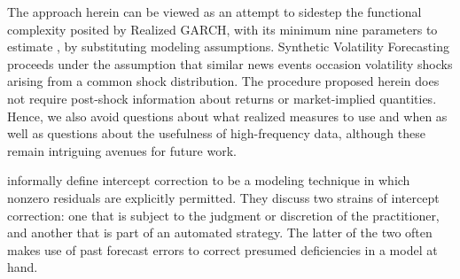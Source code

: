 \documentclass[11pt]{article}
\theoremstyle{definition}
\begin{document}
The approach herein can be viewed as an attempt to sidestep the functional complexity posited by Realized GARCH, with its minimum nine parameters to estimate \citep{sharma2016forecasting}, by substituting modeling assumptions.  Synthetic Volatility Forecasting proceeds under the assumption that similar news events occasion volatility shocks arising from a common shock distribution.  The procedure proposed herein does not require post-shock information about returns or market-implied quantities.  Hence, we also avoid questions about what realized measures to use and when as well as questions about the usefulness of high-frequency data, although these remain intriguing avenues for future work.

\citet{clements1998forecasting} informally define intercept correction to be a modeling technique in which nonzero residuals are explicitly permitted.  They discuss two strains of intercept correction: one that is subject to the judgment or discretion of the practitioner, and another that is part of an automated strategy.  The latter of the two often makes use of past forecast errors to correct presumed deficiencies in a model at hand.
\end{document}
